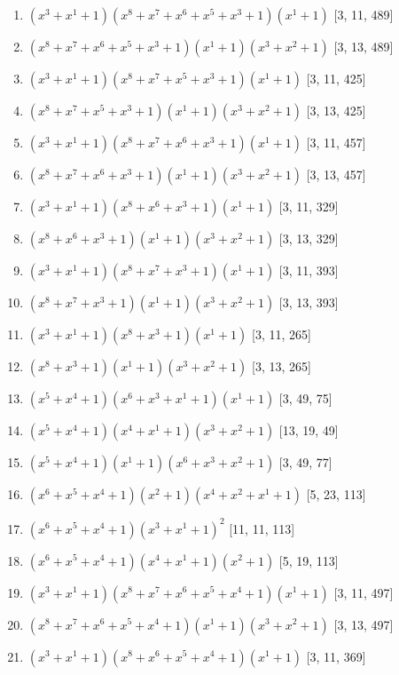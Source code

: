 \documentclass[10pt,twocolumn]{article}
\begin{document}
\begin{enumerate}
\item $(x^{3} + x^{1} + 1)(x^{8} + x^{7} + x^{6} + x^{5} + x^{3} + 1)(x^{1} + 1)$  [3, 11, 489]
\item $(x^{8} + x^{7} + x^{6} + x^{5} + x^{3} + 1)(x^{1} + 1)(x^{3} + x^{2} + 1)$  [3, 13, 489]
\item $(x^{3} + x^{1} + 1)(x^{8} + x^{7} + x^{5} + x^{3} + 1)(x^{1} + 1)$  [3, 11, 425]
\item $(x^{8} + x^{7} + x^{5} + x^{3} + 1)(x^{1} + 1)(x^{3} + x^{2} + 1)$  [3, 13, 425]
\item $(x^{3} + x^{1} + 1)(x^{8} + x^{7} + x^{6} + x^{3} + 1)(x^{1} + 1)$  [3, 11, 457]
\item $(x^{8} + x^{7} + x^{6} + x^{3} + 1)(x^{1} + 1)(x^{3} + x^{2} + 1)$  [3, 13, 457]
\item $(x^{3} + x^{1} + 1)(x^{8} + x^{6} + x^{3} + 1)(x^{1} + 1)$  [3, 11, 329]
\item $(x^{8} + x^{6} + x^{3} + 1)(x^{1} + 1)(x^{3} + x^{2} + 1)$  [3, 13, 329]
\item $(x^{3} + x^{1} + 1)(x^{8} + x^{7} + x^{3} + 1)(x^{1} + 1)$  [3, 11, 393]
\item $(x^{8} + x^{7} + x^{3} + 1)(x^{1} + 1)(x^{3} + x^{2} + 1)$  [3, 13, 393]
\item $(x^{3} + x^{1} + 1)(x^{8} + x^{3} + 1)(x^{1} + 1)$  [3, 11, 265]
\item $(x^{8} + x^{3} + 1)(x^{1} + 1)(x^{3} + x^{2} + 1)$  [3, 13, 265]
\item $(x^{5} + x^{4} + 1)(x^{6} + x^{3} + x^{1} + 1)(x^{1} + 1)$  [3, 49, 75]
\item $(x^{5} + x^{4} + 1)(x^{4} + x^{1} + 1)(x^{3} + x^{2} + 1)$  [13, 19, 49]
\item $(x^{5} + x^{4} + 1)(x^{1} + 1)(x^{6} + x^{3} + x^{2} + 1)$  [3, 49, 77]
\item $(x^{6} + x^{5} + x^{4} + 1)(x^{2} + 1)(x^{4} + x^{2} + x^{1} + 1)$  [5, 23, 113]
\item $(x^{6} + x^{5} + x^{4} + 1)(x^{3} + x^{1} + 1)^{2}$  [11, 11, 113]
\item $(x^{6} + x^{5} + x^{4} + 1)(x^{4} + x^{1} + 1)(x^{2} + 1)$  [5, 19, 113]
\item $(x^{3} + x^{1} + 1)(x^{8} + x^{7} + x^{6} + x^{5} + x^{4} + 1)(x^{1} + 1)$  [3, 11, 497]
\item $(x^{8} + x^{7} + x^{6} + x^{5} + x^{4} + 1)(x^{1} + 1)(x^{3} + x^{2} + 1)$  [3, 13, 497]
\item $(x^{3} + x^{1} + 1)(x^{8} + x^{6} + x^{5} + x^{4} + 1)(x^{1} + 1)$  [3, 11, 369]

\end{enumerate}
\end{document}
